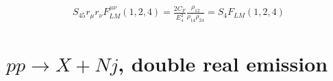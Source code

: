 \documentclass[11pt]{report}
\begin{document}
\begin{align}
    S_{45}r_\mu r_\nu F^{\mu\nu}_{LM}(1, 2, 4) = \frac{2C_F}{E_4^2}\frac{\rho_{12}}{\rho_{14}\rho_{24}} = S_4 F_{LM}(1, 2, 4)
\end{align}














































































































\section{\(pp \to X +Nj\), double real emission}
\end{document}
